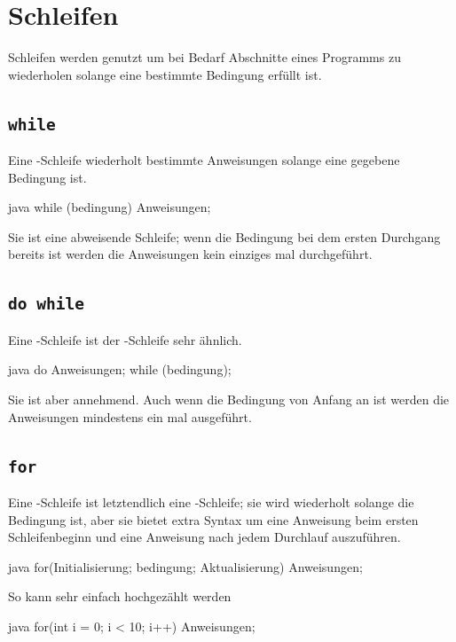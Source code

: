 \documentclass{article}
\begin{document}
\section{Schleifen} 
Schleifen werden genutzt um bei Bedarf Abschnitte eines Programms zu wiederholen solange eine bestimmte Bedingung erfüllt ist.

\subsection{\texttt{while}}
Eine -Schleife wiederholt bestimmte Anweisungen solange eine gegebene Bedingung  ist.
\begin{sourcecode}{java}
while (bedingung) {
    Anweisungen;
}
\end{sourcecode}
Sie ist eine abweisende Schleife; wenn die Bedingung bei dem ersten Durchgang bereits  ist werden die Anweisungen kein einziges mal durchgeführt.

\subsection{\texttt{do while}}
Eine -Schleife ist der -Schleife sehr ähnlich.
\begin{sourcecode}{java}
do {
    Anweisungen;
} while (bedingung);
\end{sourcecode}
Sie ist aber annehmend. Auch wenn die Bedingung von Anfang an  ist werden die Anweisungen mindestens ein mal ausgeführt.

\subsection{\texttt{for}}
Eine -Schleife ist letztendlich eine -Schleife; sie wird wiederholt solange die Bedingung  ist, aber sie bietet extra Syntax um eine Anweisung beim ersten Schleifenbeginn und eine Anweisung nach jedem Durchlauf auszuführen.
\begin{sourcecode}{java}
for(Initialisierung; bedingung; Aktualisierung) {
    Anweisungen;
}
\end{sourcecode}
So kann sehr einfach hochgezählt werden
\begin{sourcecode}{java}
for(int i = 0; i < 10; i++) {
    Anweisungen;
}
\end{sourcecode}
\end{document}
